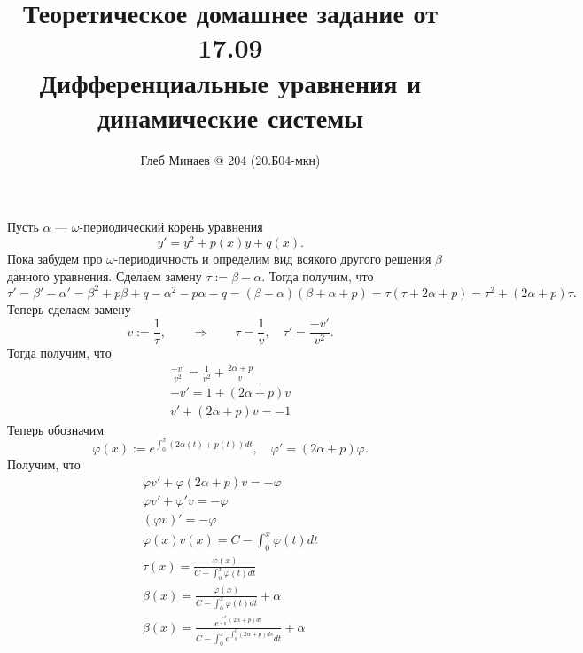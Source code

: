 \documentclass[12pt,a4paper]{article}
\title{Теоретическое домашнее задание от 17.09\\Дифференциальные уравнения и динамические системы}
\author{Глеб Минаев @ 204 (20.Б04-мкн)}
\begin{document}
    \maketitle
    
    \begin{problem}{3}
        Пусть $\alpha$ --- $\omega$-периодический корень уравнения
        \[y' = y^2 + p(x)y + q(x).\]
        Пока забудем про $\omega$-периодичность и определим вид всякого другого решения $\beta$ данного уравнения. Сделаем замену $\tau := \beta - \alpha$. Тогда получим, что
        \[
            \tau'
            = \beta' - \alpha'
            = \beta^2 + p \beta + q - \alpha^2 - p \alpha - q
            = (\beta - \alpha)(\beta + \alpha + p)
            = \tau (\tau + 2\alpha + p)
            = \tau^2 + (2\alpha + p) \tau.
        \]
        Теперь сделаем замену
        \[v := \frac{1}{\tau}, \qquad \Longrightarrow \qquad \tau = \frac{1}{v}, \quad \tau' = \frac{-v'}{v^2}.\]
        Тогда получим, что
        \begin{gather*}
            \frac{-v'}{v^2} = \frac{1}{v^2} + \frac{2\alpha + p}{v}\\
            -v' = 1 + (2\alpha + p)v\\
            v' + (2\alpha + p)v = -1
        \end{gather*}
        Теперь обозначим
        \[\varphi(x) := e^{\int_0^x (2\alpha(t) + p(t))dt}, \quad \varphi' = (2\alpha + p) \varphi.\]
        Получим, что
        \begin{gather*}
            \varphi v' + \varphi (2\alpha + p) v = -\varphi\\
            \varphi v' + \varphi' v = -\varphi\\
            (\varphi v)' = -\varphi\\
            \varphi(x) v(x) = C - \int_0^x \varphi(t) dt\\
            \tau(x) = \frac{\varphi(x)}{C - \int_0^x \varphi(t) dt}\\
            \beta(x) = \frac{\varphi(x)}{C - \int_0^x \varphi(t) dt} + \alpha\\
            \beta(x) = \frac{e^{\int_0^x (2\alpha + p)dt}}{C - \int_0^x e^{\int_0^t (2\alpha + p)ds} dt} + \alpha\\
        \end{gather*}


\end{problem}
\end{document}
